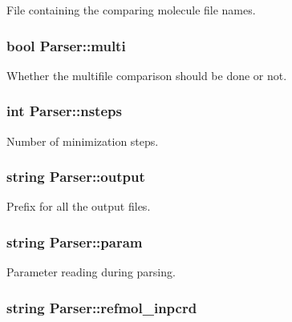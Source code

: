 File containing the comparing molecule file names. 

\hypertarget{classParser_aa1083e4b4f1db0abf7ab28a1ef55e9df}{
\subsubsection[{multi}]{\setlength{\rightskip}{0pt plus 5cm}bool {\bf Parser::multi}}}
\label{classParser_aa1083e4b4f1db0abf7ab28a1ef55e9df}


Whether the multifile comparison should be done or not. 

\hypertarget{classParser_a32c82268dfcd000070219f3d8a243cd6}{
\subsubsection[{nsteps}]{\setlength{\rightskip}{0pt plus 5cm}int {\bf Parser::nsteps}}}
\label{classParser_a32c82268dfcd000070219f3d8a243cd6}


Number of minimization steps. 

\hypertarget{classParser_a39ef75157a58e058f258a6ca4b9de7a5}{
\subsubsection[{output}]{\setlength{\rightskip}{0pt plus 5cm}string {\bf Parser::output}}}
\label{classParser_a39ef75157a58e058f258a6ca4b9de7a5}


Prefix for all the output files. 

\hypertarget{classParser_a52d2639511cc6ae75cb7e26b3a632169}{
\subsubsection[{param}]{\setlength{\rightskip}{0pt plus 5cm}string {\bf Parser::param}}}
\label{classParser_a52d2639511cc6ae75cb7e26b3a632169}


Parameter reading during parsing. 

\hypertarget{classParser_a74975ac5ab6c59e6d67ea5319590271e}{
\subsubsection[{refmol\_\-inpcrd}]{\setlength{\rightskip}{0pt plus 5cm}string {\bf Parser::refmol\_\-inpcrd}}}
\label{classParser_a74975ac5ab6c59e6d67ea5319590271e}


